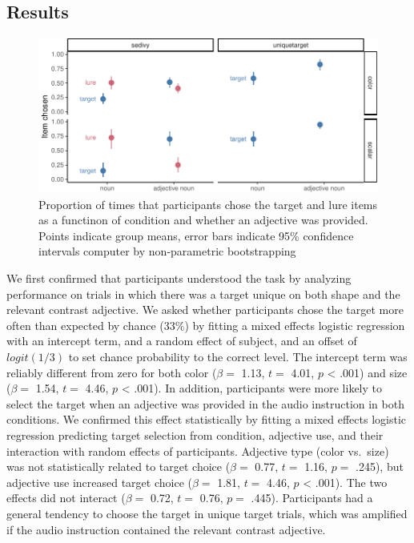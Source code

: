 \documentclass[10pt, letterpaper]{article}
\newenvironment{CodeChunk}{}{}
\begin{document}
\subsection{Results}\label{results}

\begin{CodeChunk}
\begin{figure}[tb]

{\centering \includegraphics{figs/e1_fig-1} 

}

\caption[Proportion of times that participants chose the target and lure items as a functinon of condition and whether an adjective was provided]{Proportion of times that participants chose the target and lure items as a functinon of condition and whether an adjective was provided. Points indicate group means, error bars indicate 95\% confidence intervals computer by non-parametric bootstrapping}\label{fig:e1_fig}
\end{figure}
\end{CodeChunk}

We first confirmed that participants understood the task by analyzing
performance on trials in which there was a target unique on both shape
and the relevant contrast adjective. We asked whether participants chose
the target more often than expected by chance (\(33\%\)) by fitting a
mixed effects logistic regression with an intercept term, and a random
effect of subject, and an offset of \(logit(1/3)\) to set chance
probability to the correct level. The intercept term was reliably
different from zero for both color (\(\beta =\) 1.13, \(t =\) 4.01,
\(p\) \textless{} .001) and size (\(\beta =\) 1.54, \(t =\) 4.46, \(p\)
\textless{} .001). In addition, participants were more likely to select
the target when an adjective was provided in the audio instruction in
both conditions. We confirmed this effect statistically by fitting a
mixed effects logistic regression predicting target selection from
condition, adjective use, and their interaction with random effects of
participants. Adjective type (color vs.~size) was not statistically
related to target choice (\(\beta =\) 0.77, \(t =\) 1.16, \(p =\) .245),
but adjective use increased target choice (\(\beta =\) 1.81, \(t =\)
4.46, \(p\) \textless{} .001). The two effects did not interact
(\(\beta =\) 0.72, \(t =\) 0.76, \(p =\) .445). Participants had a
general tendency to choose the target in unique target trials, which was
amplified if the audio instruction contained the relevant contrast
adjective.
\end{document}
